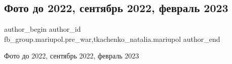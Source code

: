  
 
 
 
 

\subsection{Фото до 2022, сентябрь 2022, февраль 2023}
\label{sec:15_02_2023.fb.fb_group.mariupol.pre_war.2.foto_do_2022__sentya}
 
\ifcmt
 author_begin
   author_id fb_group.mariupol.pre_war,tkachenko_natalia.mariupol
 author_end
\fi

Фото до 2022, сентябрь 2022, февраль 2023

